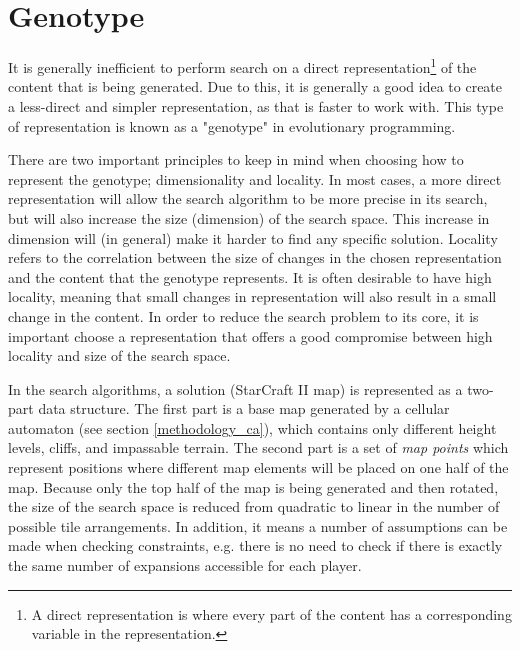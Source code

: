 \section{Genotype}
\label{methodology_genotype}
It is generally inefficient to perform search on a direct representation\footnote{A direct representation is where every part of the content has a corresponding variable in the representation.} of the content that is being generated. Due to this, it is generally a good idea to create a less-direct and simpler representation, as that is faster to work with. This type of representation is known as a "genotype" in evolutionary programming.

There are two important principles to keep in mind when choosing how to represent the genotype; dimensionality and locality. In most cases, a more direct representation will allow the search algorithm to be more precise in its search, but will also increase the size (dimension) of the search space. This increase in dimension will (in general) make it harder to find any specific solution. Locality refers to the correlation between the size of changes in the chosen representation and the content that the genotype represents. It is often desirable to have high locality, meaning that small changes in representation will also result in a small change in the content\cite{togelius2015searchbased}. In order to reduce the search problem to its core, it is important choose a representation that offers a good compromise between high locality and size of the search space. 

In the search algorithms, a solution (StarCraft II map) is represented as a two-part data structure. The first part is a base map generated by a cellular automaton (see section \ref{methodology_ca}), which contains only different height levels, cliffs, and impassable terrain. The second part is a set of \textit{map points} which represent positions where different map elements will be placed on one half of the map. Because only the top half of the map is being generated and then rotated, the size of the search space is reduced from quadratic to linear in the number of possible tile arrangements. In addition, it means a number of assumptions can be made when checking constraints, e.g. there is no need to check if there is exactly the same number of expansions accessible for each player.

